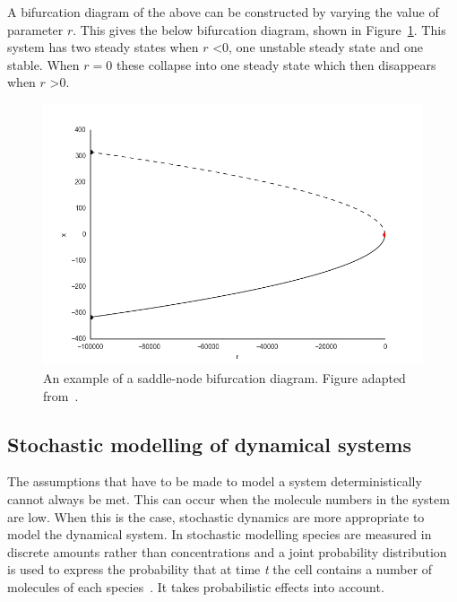 \noindent A bifurcation diagram of the above can be constructed by varying the value of parameter $r$. This gives the below bifurcation diagram, shown in Figure~\ref{fig:exampl_bifurc}. This system has two steady states when $r$ \textless 0, one unstable steady state and one stable. When $r = 0$ these collapse into one steady state which then disappears when $r$ \textgreater 0. 
\newpage
\begin{figure}[h]
    \begin{center}
    \includegraphics[scale=0.5]{../../chapters/chapterBackgr/images/example_bifurc.png}
    \caption[Example of a saddle-node bifurcation diagram]{An example of a saddle-node bifurcation diagram. Figure adapted from~\textcite{Strogatz:1994}.}
    \label{fig:exampl_bifurc}
    \end{center}
\end{figure}




\subsection{Stochastic modelling of dynamical systems}

The assumptions that have to be made to model a system deterministically cannot always be met. This can occur when the molecule numbers in the system are low. When this is the case, stochastic dynamics are more appropriate to model the dynamical system. In stochastic modelling species are measured in discrete amounts rather than concentrations and a joint probability distribution is used to express the probability that at time \textit{t} the cell contains a number of molecules of each species~\autocite{deJong:2002ft,khamash_iglesias:2010}. It takes probabilistic effects into account. 

